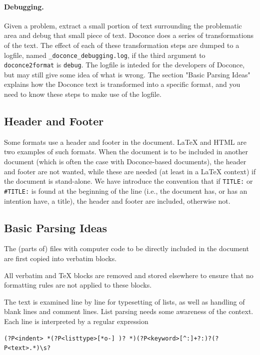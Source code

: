 \documentclass{article}
\begin{document}
\paragraph{Debugging.}
Given a problem, extract a small portion of text surrounding the
problematic area and debug that small piece of text. Doconce does a
series of transformations of the text. The effect of each of these
transformation steps are dumped to a logfile, named
{\fontsize{10pt}{10pt}\verb!_doconce_debugging.log!}, if the third argument to {\fontsize{10pt}{10pt}\verb!doconce2format!}
is {\fontsize{10pt}{10pt}\verb!debug!}. The logfile is inteded for the developers of Doconce, but
may still give some idea of what is wrong.  The section "Basic Parsing
Ideas" explains how the Doconce text is transformed into a specific
format, and you need to know these steps to make use of the logfile.

\subsection{Header and Footer}

Some formats use a header and footer in the document. {\LaTeX} and
HTML are two examples of such formats. When the document is to be
included in another document (which is often the case with
Doconce-based documents), the header and footer are not wanted, while
these are needed (at least in a {\LaTeX} context) if the document is
stand-alone. We have introduce the convention that if {\fontsize{10pt}{10pt}\verb!TITLE:!} or
{\fontsize{10pt}{10pt}\verb!#TITLE:!} is found at the beginning of the line (i.e., the document
has, or has an intention have, a title), the header and footer
are included, otherwise not.

\subsection{Basic Parsing Ideas}


The (parts of) files with computer code to be directly included in
the document are first copied into verbatim blocks.

All verbatim and TeX blocks are removed and stored elsewhere
to ensure that no formatting rules are not applied to these blocks.

The text is examined line by line for typesetting of lists, as well as
handling of blank lines and comment lines.
List parsing needs some awareness of the context.
Each line is interpreted by a regular expression
\begin{Verbatim}[fontsize=\fontsize{9pt}{9pt},tabsize=8,baselinestretch=0.85,
fontfamily=tt,xleftmargin=7mm]
(?P<indent> *(?P<listtype>[*o-] )? *)(?P<keyword>[^:]+?:)?(?P<text>.*)\s?
\end{Verbatim}
\noindent
\end{document}
